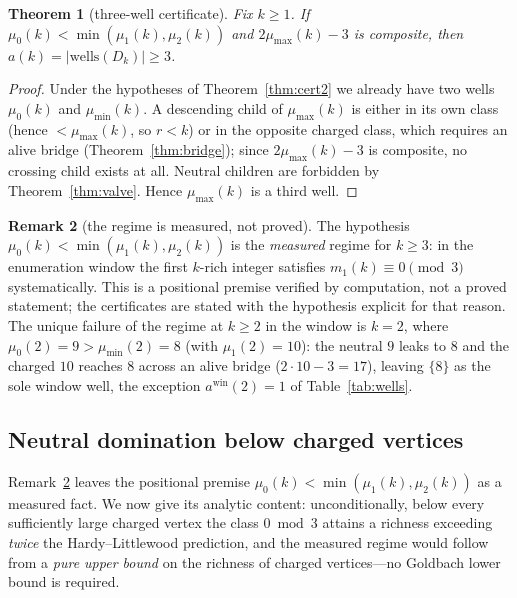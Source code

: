\documentclass[11pt]{article}
\theoremstyle{plain}
\newtheorem{theorem}{Theorem}[section]
\theoremstyle{definition}
\newtheorem{remark}[theorem]{Remark}
\newcommand{\rch}{r}
\newcommand{\Dk}{D_{k}}
\newcommand{\wells}{\mathrm{wells}}
\begin{document}
\begin{theorem}[three-well certificate]\label{thm:cert3}
Fix $k \ge 1$. If $\mu_0(k) < \min(\mu_1(k),\mu_2(k))$ and
$2\mu_{\max}(k) - 3$ is composite, then $a(k) = |\wells(\Dk)| \ge 3$.
\end{theorem}

\begin{proof}
Under the hypotheses of Theorem~\ref{thm:cert2} we already have two
wells $\mu_0(k)$ and $\mu_{\min}(k)$. A descending child of
$\mu_{\max}(k)$ is either in its own class (hence
$< \mu_{\max}(k)$, so $\rch < k$) or in the opposite charged class,
which requires an alive bridge (Theorem~\ref{thm:bridge}); since
$2\mu_{\max}(k)-3$ is composite, no crossing child exists at all.
Neutral children are forbidden by Theorem~\ref{thm:valve}. Hence
$\mu_{\max}(k)$ is a third well.
\end{proof}

\begin{remark}[the regime is measured, not proved]
\label{rem:regime}
The hypothesis $\mu_0(k) < \min(\mu_1(k),\mu_2(k))$ is the
\emph{measured} regime for $k \ge 3$: in the enumeration window the
first $k$-rich integer satisfies $m_1(k) \equiv 0 \pmod 3$
systematically. This is a positional premise verified by
computation, not a proved statement; the certificates are stated
with the hypothesis explicit for that reason. The unique failure
of the regime at $k \ge 2$ in the window is $k = 2$, where
$\mu_0(2) = 9 > \mu_{\min}(2) = 8$ (with $\mu_1(2) = 10$): the
neutral $9$ leaks to $8$ and the charged $10$ reaches $8$ across an
alive bridge ($2\cdot 10 - 3 = 17$), leaving $\{8\}$ as the sole
window well, the exception $a^{\mathrm{win}}(2) = 1$ of
Table~\ref{tab:wells}.
\end{remark}

\subsection{Neutral domination below charged vertices}
\label{sec:neudom}

Remark~\ref{rem:regime} leaves the positional premise
$\mu_0(k) < \min(\mu_1(k),\mu_2(k))$ as a measured fact. We now give
its analytic content: unconditionally, below every sufficiently
large charged vertex the class $0 \bmod 3$ attains a richness
exceeding \emph{twice} the Hardy--Littlewood prediction, and the
measured regime would follow from a \emph{pure upper bound} on the
richness of charged vertices---no Goldbach lower bound is required.
\end{document}
